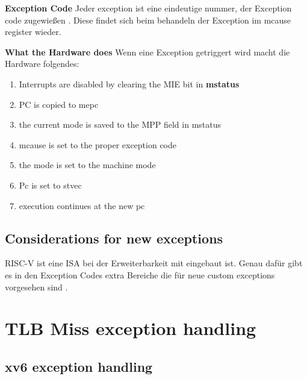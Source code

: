 \textbf{Exception Code} Jeder exception ist eine eindeutige nummer, der Exception code zugewießen
\cite{riscvreader}. Diese findet sich beim behandeln der Exception im mcause register wieder.


\textbf{What the Hardware does} Wenn eine Exception getriggert wird macht die Hardware folgendes:
\begin{enumerate}
    \item Interrupts are disabled by clearing the MIE bit in \textbf{mstatus}
    \item PC is copied to mepc
    \item the current mode is saved to the MPP field in mstatus
    \item mcause is set to the proper exception code
    \item the mode is set to the machine mode
    \item Pc is set to stvec
    \item execution continues at the new pc
\end{enumerate}




\subsection{Considerations for new exceptions}
RISC-V ist eine ISA bei der Erweiterbarkeit mit eingebaut ist. Genau dafür gibt es in den
Exception Codes extra Bereiche die für neue custom exceptions vorgesehen sind \cite{RISCVInstructionSet}.


\section{TLB Miss exception handling}
\subsection{xv6 exception handling}

